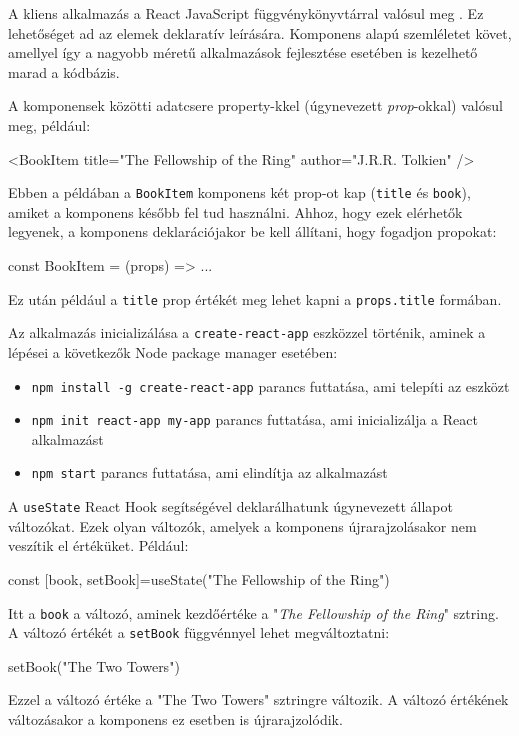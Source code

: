 
A kliens alkalmazás a React JavaScript függvénykönyvtárral valósul meg \cite{react}. Ez lehetőséget ad az elemek deklaratív leírására. Komponens alapú szemléletet követ, amellyel így a nagyobb méretű alkalmazások fejlesztése esetében is kezelhető marad a kódbázis.

A komponensek közötti adatcsere property-kkel (úgynevezett \textit{prop}-okkal) valósul meg, például:
\begin{java}
<BookItem
  title={"The Fellowship of the Ring"}
  author={"J.R.R. Tolkien"}
/>
\end{java}
Ebben a példában a \texttt{BookItem} komponens két prop-ot kap (\texttt{title} és \texttt{book}), amiket a komponens később fel tud használni. Ahhoz, hogy ezek elérhetők legyenek, a komponens deklarációjakor be kell állítani, hogy fogadjon propokat:
\begin{java}
const BookItem = (props) => {...}
\end{java}
Ez után például a \texttt{title} prop értékét meg lehet kapni a \texttt{props.title} formában.

Az alkalmazás inicializálása a \texttt{create-react-app} eszközzel történik, aminek a lépései a következők Node package manager esetében:
\begin{itemize}
    \item \texttt{npm install -g create-react-app} parancs futtatása, ami telepíti az eszközt
    \item \texttt{npm init react-app my-app} parancs futtatása, ami inicializálja a React alkalmazást
    \item \texttt{npm start} parancs futtatása, ami elindítja az alkalmazást
\end{itemize}

A \texttt{useState} React Hook segítségével deklarálhatunk úgynevezett állapot változókat. Ezek olyan változók, amelyek a komponens újrarajzolásakor nem veszítik el értéküket. Például:
\begin{java}
const [book, setBook]=useState("The Fellowship of the Ring")
\end{java}
Itt a \texttt{book} a változó, aminek kezdőértéke a "\textit{The Fellowship of the Ring}" sztring. A változó értékét a \texttt{setBook} függvénnyel lehet megváltoztatni:
\begin{java}
setBook("The Two Towers")
\end{java}
Ezzel a változó értéke a "The Two Towers" sztringre változik. A változó értékének változásakor a komponens ez esetben is újrarajzolódik.

